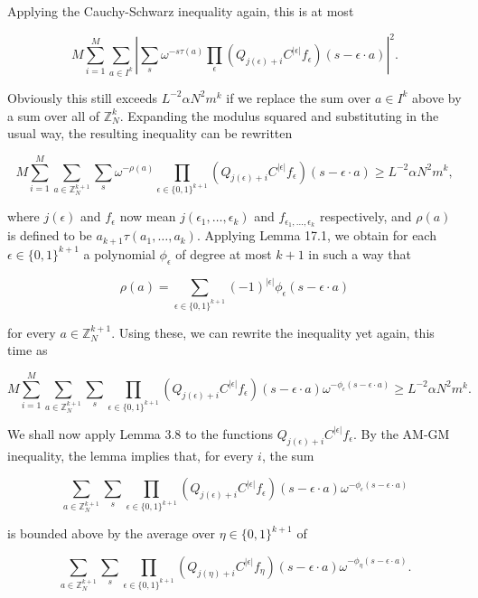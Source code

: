 \documentclass[10pt]{article}
\begin{document}
Applying the Cauchy-Schwarz inequality again, this is at most

$$
M \sum_{i=1}^{M} \sum_{a \in I^{k}}\left|\sum_{s} \omega^{-s \tau(a)} \prod_{\epsilon}\left(Q_{j(\epsilon)+i} C^{|\epsilon|} f_{\epsilon}\right)(s-\epsilon \cdot a)\right|^{2} .
$$

Obviously this still exceeds $L^{-2} \alpha N^{2} m^{k}$ if we replace the sum over $a \in I^{k}$ above by a sum over all of $\mathbb{Z}_{N}^{k}$. Expanding the modulus squared and substituting in the usual way, the resulting inequality can be rewritten

$$
M \sum_{i=1}^{M} \sum_{a \in \mathbb{Z}_{N}^{k+1}} \sum_{s} \omega^{-\rho(a)} \prod_{\epsilon \in\{0,1\}^{k+1}}\left(Q_{j(\epsilon)+i} C^{|\epsilon|} f_{\epsilon}\right)(s-\epsilon \cdot a) \geqslant L^{-2} \alpha N^{2} m^{k},
$$

where $j(\epsilon)$ and $f_{\epsilon}$ now mean $j\left(\epsilon_{1}, \ldots, \epsilon_{k}\right)$ and $f_{\epsilon_{1}, \ldots, \epsilon_{k}}$ respectively, and $\rho(a)$ is defined to be $a_{k+1} \tau\left(a_{1}, \ldots, a_{k}\right)$. Applying Lemma 17.1, we obtain for each $\epsilon \in\{0,1\}^{k+1}$ a polynomial $\phi_{\epsilon}$ of degree at most $k+1$ in such a way that

$$
\rho(a)=\sum_{\epsilon \in\{0,1\}^{k+1}}(-1)^{|\epsilon|} \phi_{\epsilon}(s-\epsilon \cdot a)
$$

for every $a \in \mathbb{Z}_{N}^{k+1}$. Using these, we can rewrite the inequality yet again, this time as

$$
M \sum_{i=1}^{M} \sum_{a \in \mathbb{Z}_{N}^{k+1}} \sum_{s} \prod_{\epsilon \in\{0,1\}^{k+1}}\left(Q_{j(\epsilon)+i} C^{|\epsilon|} f_{\epsilon}\right)(s-\epsilon \cdot a) \omega^{-\phi_{\epsilon}(s-\epsilon \cdot a)} \geqslant L^{-2} \alpha N^{2} m^{k} .
$$

We shall now apply Lemma 3.8 to the functions $Q_{j(\epsilon)+i} C^{|\epsilon|} f_{\epsilon}$. By the AM-GM inequality, the lemma implies that, for every $i$, the sum

$$
\sum_{a \in \mathbb{Z}_{N}^{k+1}} \sum_{s} \prod_{\epsilon \in\{0,1\}^{k+1}}\left(Q_{j(\epsilon)+i} C^{|\epsilon|} f_{\epsilon}\right)(s-\epsilon \cdot a) \omega^{-\phi_{\epsilon}(s-\epsilon \cdot a)}
$$

is bounded above by the average over $\eta \in\{0,1\}^{k+1}$ of

$$
\sum_{a \in \mathbb{Z}_{N}^{k+1}} \sum_{s} \prod_{\epsilon \in\{0,1\}^{k+1}}\left(Q_{j(\eta)+i} C^{|\epsilon|} f_{\eta}\right)(s-\epsilon \cdot a) \omega^{-\phi_{\eta}(s-\epsilon \cdot a)} .
$$
\end{document}
